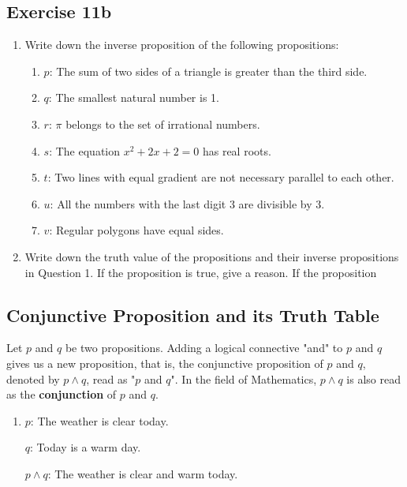 \documentclass{report}
\newcounter{example}
\begin{document}
\subsection*{Exercise 11b}
\begin{enumerate}[leftmargin=*]
    \item Write down the inverse proposition of the following propositions:
          \begin{enumerate}[label=, leftmargin=*]
              \item $p$: The sum of two sides of a triangle is greater than the third side.
              \item $q$: The smallest natural number is 1.
              \item $r$: $\pi$ belongs to the set of irrational numbers.
              \item $s$: The equation $x^2 + 2x + 2 = 0$ has real roots.
              \item $t$: Two lines with equal gradient are not necessary parallel to each other.
              \item $u$: All the numbers with the last digit 3 are divisible by 3.
              \item $v$: Regular polygons have equal sides.
          \end{enumerate}
    \item Write down the truth value of the propositions and their inverse propositions
          in Question 1. If the proposition is true, give a reason. If the proposition
\end{enumerate}

\subsection*{Conjunctive Proposition and its Truth Table}

Let $p$ and $q$ be two propositions. Adding a logical connective "and" to $p$
and $q$ gives us a new proposition, that is, the conjunctive proposition of $p$
and $q$, denoted by $p \land q$, read as "$p$ and $q$". In the field of
Mathematics, $p \land q$ is also read as the \textbf{conjunction} of $p$ and
$q$.

\begin{enumerate}[label=\indent For example, leftmargin=*]
    \item $p$: The weather is clear today.

          $q$: Today is a warm day.

          $p \land q$: The weather is clear and warm today.
\end{enumerate}
\end{document}

